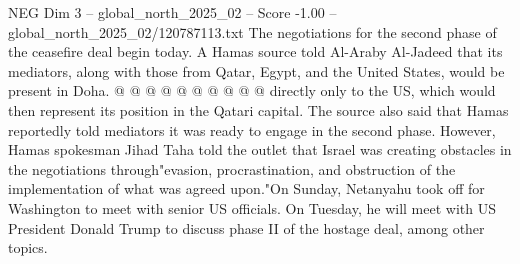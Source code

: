 \begin{textsample}{NEG Dim 3 – global\_north\_2025\_02 – Score -1.00 – global\_north\_2025\_02/120787113.txt}
The negotiations for the second phase of the ceasefire deal begin today.
A Hamas source told Al-Araby Al-Jadeed that its mediators, along with those from Qatar, Egypt, and the United States, would be present in Doha. @ @ @ @ @ @ @ @ @ @ directly only to the US, which would then represent its position in the Qatari capital.
The source also said that Hamas reportedly told mediators it was ready to engage in the second phase.
However, Hamas spokesman Jihad Taha told the outlet that Israel was creating obstacles in the negotiations through"evasion, procrastination, and obstruction of the implementation of what was agreed upon."On Sunday, Netanyahu took off for Washington to meet with senior US officials.
On Tuesday, he will meet with US President Donald Trump to discuss phase II of the hostage deal, among other topics.

\end{textsample}
